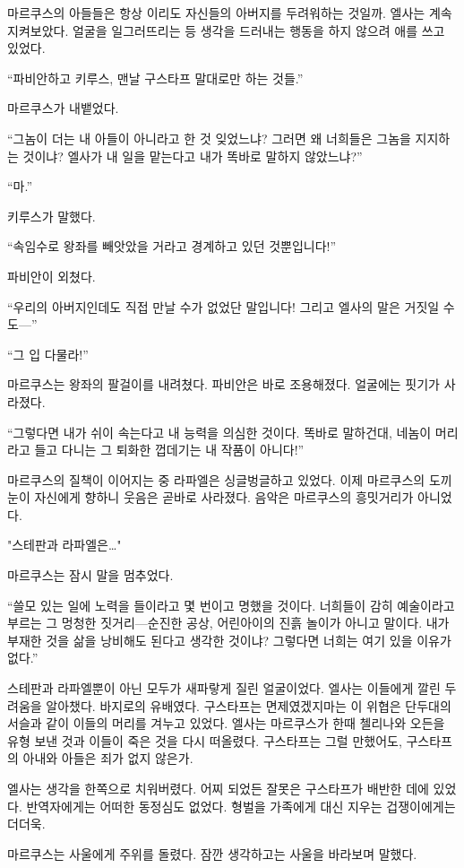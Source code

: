 마르쿠스의 아들들은 항상 이리도 자신들의 아버지를 두려워하는 것일까. 엘사는 계속 지켜보았다. 얼굴을 일그러뜨리는 등 생각을 드러내는 행동을 하지 않으려 애를 쓰고 있었다.

``파비안하고 키루스, 맨날 구스타프 말대로만 하는 것들.''

마르쿠스가 내뱉었다.

``그놈이 더는 내 아들이 아니라고 한 것 잊었느냐? 그러면 왜 너희들은 그놈을 지지하는 것이냐? 엘사가 내 일을 맡는다고 내가 똑바로 말하지 않았느냐?''

``마.''

키루스가 말했다.

``속임수로 왕좌를 빼앗았을 거라고 경계하고 있던 것뿐입니다!''

파비안이 외쳤다.

``우리의 아버지인데도 직접 만날 수가 없었단 말입니다! 그리고 엘사의 말은 거짓일 수도—''

``그 입 다물라!''

마르쿠스는 왕좌의 팔걸이를 내려쳤다. 파비안은 바로 조용해졌다. 얼굴에는 핏기가 사라졌다.

``그렇다면 내가 쉬이 속는다고 내 능력을 의심한 것이다. 똑바로 말하건대, 네놈이 머리라고 들고 다니는 그 퇴화한 껍데기는 내 작품이 아니다!''

마르쿠스의 질책이 이어지는 중 라파엘은 싱글벙글하고 있었다. 이제 마르쿠스의 도끼눈이 자신에게 향하니 웃음은 곧바로 사라졌다. 음악은 마르쿠스의 흥밋거리가 아니었다.

"스테판과 라파엘은\ldots"

마르쿠스는 잠시 말을 멈추었다.

``쓸모 있는 일에 노력을 들이라고 몇 번이고 명했을 것이다. 너희들이 감히 예술이라고 부르는 그 멍청한 짓거리—순진한 공상, 어린아이의 진흙 놀이가 아니고 말이다. 내가 부재한 것을 삶을 낭비해도 된다고 생각한 것이냐? 그렇다면 너희는 여기 있을 이유가 없다.''

스테판과 라파엘뿐이 아닌 모두가 새파랗게 질린 얼굴이었다. 엘사는 이들에게 깔린 두려움을 알아챘다. 바지로의 유배였다. 구스타프는 면제였겠지마는 이 위협은 단두대의 서슬과 같이 이들의 머리를 겨누고 있었다. 엘사는 마르쿠스가 한때 첼리나와 오든을 유형 보낸 것과 이들이 죽은 것을 다시 떠올렸다. 구스타프는 그럴 만했어도, 구스타프의 아내와 아들은 죄가 없지 않은가.

엘사는 생각을 한쪽으로 치워버렸다. 어찌 되었든 잘못은 구스타프가 배반한 데에 있었다. 반역자에게는 어떠한 동정심도 없었다. 형벌을 가족에게 대신 지우는 겁쟁이에게는 더더욱.

마르쿠스는 사울에게 주위를 돌렸다. 잠깐 생각하고는 사울을 바라보며 말했다.

